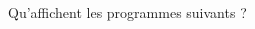 
\begin{exercice}\label{exoSeconde-0018}

    Qu'affichent les programmes suivants ?
    \begin{multicols}{2}





\columnbreak




    \end{multicols}

\end{exercice}
